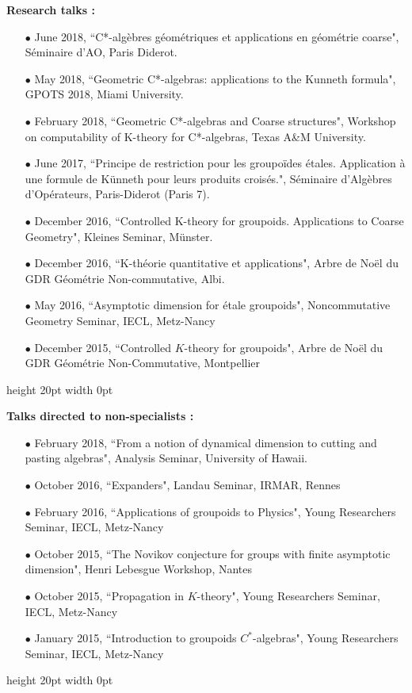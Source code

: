 \documentclass[a4paper,11pt]{article}
\newcommand\espace{\vrule height 20pt width 0pt}
\begin{document}
\textbf{Research talks :}\\

\begin{itemize}
\item[$\bullet$] June 2018, ``C*-alg\`ebres g\'eom\'etriques et applications en g\'eom\'etrie coarse", S\'eminaire d'AO, Paris Diderot.
\item[$\bullet$] May 2018, ``Geometric C*-algebras: applications to the Kunneth formula", GPOTS 2018, Miami University.
\item[$\bullet$] February 2018, ``Geometric C*-algebras and Coarse structures", Workshop on computability of K-theory for C*-algebras, Texas A\&M University.
\item[$\bullet$] June 2017, ``Principe de restriction pour les groupoïdes étales. Application à une formule de Künneth pour leurs produits croisés.", Séminaire d'Algèbres d'Opérateurs, Paris-Diderot (Paris 7).
\item[$\bullet$] December 2016, ``Controlled K-theory for groupoids. Applications to Coarse Geometry", Kleines Seminar, Münster.
\item[$\bullet$] December 2016, ``K-théorie quantitative et applications", Arbre de Noël du GDR Géométrie Non-commutative, Albi.
\item[$\bullet$] May 2016, ``Asymptotic dimension for étale groupoids", Noncommutative Geometry Seminar, IECL, Metz-Nancy
\item[$\bullet$] December 2015, ``Controlled $K$-theory for groupoids", Arbre de Noël du GDR Géométrie Non-Commutative, Montpellier
\end{itemize}
\espace

\textbf{Talks directed to non-specialists :}\\

\begin{itemize}
\item[$\bullet$] February 2018, ``From a notion of dynamical dimension to cutting and pasting algebras", Analysis Seminar, University of Hawaii.
\item[$\bullet$] October 2016, ``Expanders", Landau Seminar, IRMAR, Rennes %
\item[$\bullet$] February 2016, ``Applications of groupoids to Physics", Young Researchers Seminar, IECL, Metz-Nancy
\item[$\bullet$] October 2015, ``The Novikov conjecture for groups with finite asymptotic dimension", Henri Lebesgue Workshop, Nantes
\item[$\bullet$] October 2015, ``Propagation in $K$-theory", Young Researchers Seminar, IECL, Metz-Nancy
\item[$\bullet$] January 2015, ``Introduction to groupoids $C^*$-algebras", Young Researchers Seminar, IECL, Metz-Nancy
\end{itemize}
\espace
\end{document}
